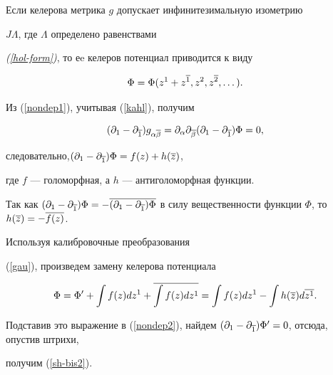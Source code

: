 \begin{lem}\label{sh-lm1}


Если келерова метрика $g$ допускает инфинитезимальную изометрию


$J\Lambda$, где $\Lambda$ определено равенствами


{\em (\ref{hol-form})}, то еe келеров потенциал приводится к виду


\begin{equation}


\label{sh-bis2}


\Phi = \Phi (z^1 +z^{\ol 1}, z^2, z^{\ol 2}, \dotsc ).


\end{equation}


\end{lem}





\begin{pf} Из (\ref{nondep1}), учитывая (\ref{kahl}), получим


\begin{equation}


\label{nondep2}


(\pl 1 -\pl{\ol 1}) g_{\alpha\ol\beta} =


\pl{\alpha}\pl{\ol\beta} \dmin\Phi=0,


\end{equation}


следовательно,$ (\partial_1-\partial_{\overline{1}}) \Phi= f(z) + h(\overline z)$,


где $f$ --- голоморфная, а $h$ --- антиголоморфная функции.


Так как $(\pl 1 - \pl{\ol 1}) \Phi = - \ol{(\pl 1 -\pl{\ol 1})


\Phi}$ в силу вещественности функции $\Phi$, то $h(\ol z) =- \ol{f(z)}$.


Используя калибровочные преобразования


(\ref{gau}), произведем замену келерова потенциала


$$


\Phi = \Phi' +\int f(z) dz^1 + \ol{\int f(z) d z^1}=


\int f(z)dz^1 -\int h(\ol z) d \ol{z^1}.


$$


Подставив это выражение в (\ref{nondep2}), найдем $(\pl 1 -\pl{\ol 1})


\Phi' =0$, отсюда, опустив штрихи,


получим (\ref{sh-bis2}).


\end{pf}





